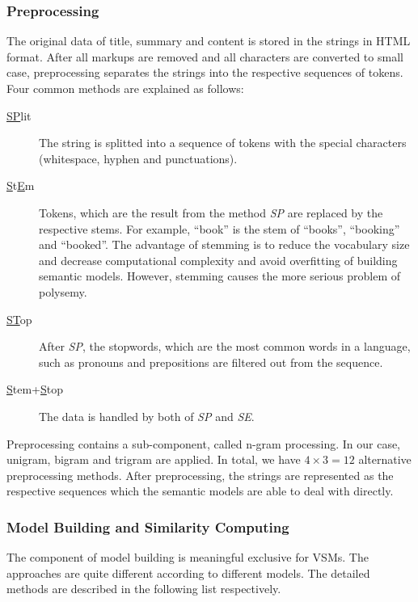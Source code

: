 \subsubsection{Preprocessing}
The original data of title, summary and content is stored in the strings in HTML format. After all markups are removed and all characters are converted to small case, preprocessing separates the strings into the respective sequences of tokens. Four common methods are explained as follows:

\begin{description}
\item[\underline{SP}lit] The string is splitted into a sequence of tokens with the special characters (whitespace, hyphen and punctuations). 
\item[\underline{S}t\underline{E}m] Tokens, which are the result from the method \textit{SP} are replaced by the respective stems. For example, ``book'' is the stem of ``books'', ``booking'' and ``booked''. The advantage of stemming is to reduce the vocabulary size and decrease computational complexity and avoid overfitting of building semantic models. However, stemming causes the more serious problem of polysemy. 
\item[\underline{ST}op] After \textit{SP}, the stopwords, which are the most common words in a language, such as pronouns and prepositions are filtered out from the sequence. 
\item[\underline{S}tem+\underline{S}top] The data is handled by both of \textit{SP} and \textit{SE}. 
\end{description}

Preprocessing contains a sub-component, called n-gram processing. In our case, unigram, bigram and trigram are applied. In total, we have $4 \times 3 = 12$ alternative preprocessing methods. After preprocessing, the strings are represented as the respective sequences which the semantic models are able to deal with directly. 

\subsubsection{Model Building and Similarity Computing}
The component of model building is meaningful exclusive for VSMs. The approaches are quite different according to different models.  The detailed methods are described in the following list respectively.

